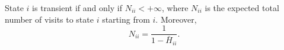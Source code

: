 State $i$ is transient if and only if $N_{ii} < +\infty$, where $N_{ii}$ is the expected total number of visits to state $i$ starting from $i$. Moreover,
$$N_{ii} = \frac{1}{1 - \bar{H}_{ii}}.$$
